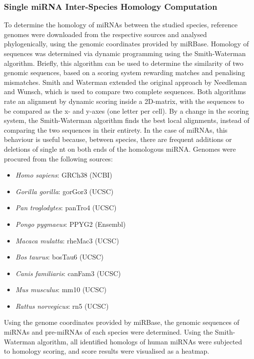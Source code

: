 \begin{method}
\subsubsection{Single miRNA Inter-Species Homology Computation}
To determine the homology of miRNAs between the studied species, reference genomes were downloaded from the respective sources and analysed phylogenically, using the genomic coordinates provided by miRBase. Homology of sequences was determined via dynamic programming using the Smith-Waterman algorithm.\cite{Smith1981} Briefly, this algorithm can be used to determine the similarity of two genomic sequences, based on a scoring system rewarding matches and penalising mismatches. Smith and Waterman extended the original approach by Needleman and Wunsch,\cite{Needleman1970} which is used to compare two complete sequences. Both algorithms rate an alignment by dynamic scoring inside a 2D-matrix, with the sequences to be compared as the x- and y-axes (one letter per cell). By a change in the scoring system, the Smith-Waterman algorithm finds the best local alignments, instead of comparing the two sequences in their entirety. In the case of miRNAs, this behaviour is useful because, between species, there are frequent additions or deletions of single \ac{nt} on both ends of the homologous miRNA. Genomes were procured from the following sources:
\begin{itemize}[noitemsep, leftmargin=.5cm, label={\tiny\raisebox{.5ex}{\textbullet}}]
\item \emph{Homo sapiens}: GRCh38 (NCBI)
\item \emph{Gorilla gorilla}: gorGor3 (UCSC)
\item \emph{Pan troglodytes}: panTro4 (UCSC)
\item \emph{Pongo pygmaeus}: PPYG2 (Ensembl)
\item \emph{Macaca mulatta}: rheMac3 (UCSC)
\item \emph{Bos taurus}: bosTau6 (UCSC)
\item \emph{Canis familiaris}: canFam3 (UCSC)
\item \emph{Mus musculus}: mm10 (UCSC)
\item \emph{Rattus norvegicus}: rn5 (UCSC)
\end{itemize}

Using the genome coordinates provided by miRBase, the genomic sequences of miRNAs and pre-miRNAs of each species were determined. Using the Smith-Waterman algorithm, all identified homologs of human miRNAs were subjected to homology scoring, and score results were visualised as a heatmap.

\end{method}


